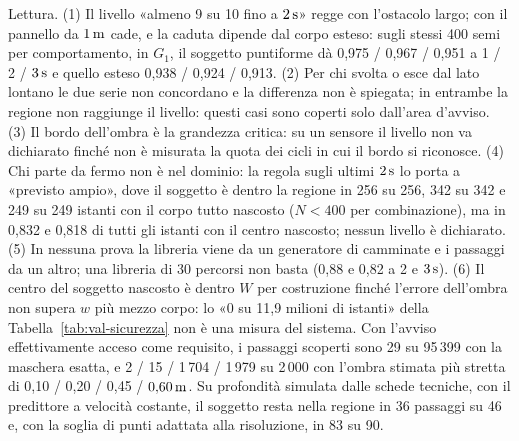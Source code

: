 Lettura. (1) Il livello «almeno 9 su 10 fino a $2\,\mathrm{s}$» regge con l'ostacolo largo; con il pannello da $1\,\mathrm{m}$ cade, e la caduta dipende dal corpo esteso: sugli stessi 400 semi per comportamento, in $G_1$, il soggetto puntiforme dà 0,975 / 0,967 / 0,951 a 1 / 2 / $3\,\mathrm{s}$ e quello esteso 0,938 / 0,924 / 0,913. (2) Per chi svolta o esce dal lato lontano le due serie non concordano e la differenza non è spiegata; in entrambe la regione non raggiunge il livello: questi casi sono coperti solo dall'area d'avviso. (3) Il bordo dell'ombra è la grandezza critica: su un sensore il livello non va dichiarato finché non è misurata la quota dei cicli in cui il bordo si riconosce. (4) Chi parte da fermo non è nel dominio: la regola sugli ultimi $2\,\mathrm{s}$ lo porta a «previsto ampio», dove il soggetto è dentro la regione in 256 su 256, 342 su 342 e 249 su 249 istanti con il corpo tutto nascosto ($N<400$ per combinazione), ma in 0,832 e 0,818 di tutti gli istanti con il centro nascosto; nessun livello è dichiarato. (5) In nessuna prova la libreria viene da un generatore di camminate e i passaggi da un altro; una libreria di 30 percorsi non basta (0,88 e 0,82 a 2 e $3\,\mathrm{s}$). (6) Il centro del soggetto nascosto è dentro $W$ per costruzione finché l'errore dell'ombra non supera $w$ più mezzo corpo: lo «0 su 11,9 milioni di istanti» della Tabella~\ref{tab:val-sicurezza} non è una misura del sistema. Con l'avviso effettivamente acceso come requisito, i passaggi scoperti sono 29 su 95\,399 con la maschera esatta, e 2 / 15 / 1\,704 / 1\,979 su 2\,000 con l'ombra stimata più stretta di 0,10 / 0,20 / 0,45 / $0{,}60\,\mathrm{m}$. Su profondità simulata dalle schede tecniche, con il predittore a velocità costante, il soggetto resta nella regione in 36 passaggi su 46 e, con la soglia di punti adattata alla risoluzione, in 83 su 90.

